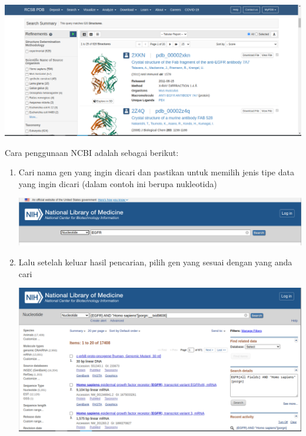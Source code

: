 \documentclass{article}
\begin{document}
\begin{flushleft}
\begin{enumerate}
            \includegraphics[scale=0.3]{Modul1/img/12.png}      
        \end{enumerate}
            Cara penggunaan NCBI adalah sebagai berikut:
            \begin{enumerate}
                \item Cari nama gen yang ingin dicari dan pastikan untuk memilih jenis tipe data yang ingin dicari (dalam contoh ini berupa nukleotida)
                \par\vspace{0.5cm}
                \includegraphics[scale=0.3]{Modul1/img/13.png}

                \item Lalu setelah keluar hasil pencarian, pilih gen yang sesuai dengan yang anda cari
                \par\vspace{0.5cm}
                \includegraphics[scale=0.3]{Modul1/img/14.png}


\end{enumerate}
\end{flushleft}
\end{document}
